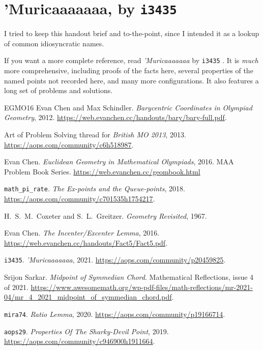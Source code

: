 \documentclass[11pt]{scrartcl}
\begin{document}
\section{’Muricaaaaaaa, by \texttt{i3435}}
I tried to keep this handout brief and to-the-point,
since I intended it as a lookup of common idiosyncratic names.

If you want a more complete reference,
read \emph{’Muricaaaaaaa} by \texttt{i3435} \cite{M21}.
It is \emph{much} more comprehensive, including proofs of the facts here,
several properties of the named points not recorded here, and many more configurations.
It also features a long set of problems and solutions.

\begin{thebibliography}{EGMO16}
  Evan Chen and Max Schindler.
  \emph{Barycentric Coordinates in Olympiad Geometry}, 2012.
  \url{https://web.evanchen.cc/handouts/bary/bary-full.pdf}.

  Art of Problem Solving thread for \textit{British MO 2013}, 2013.
  \url{https://aops.com/community/c6h518987}.

  Evan Chen.
  \emph{Euclidean Geometry in Mathematical Olympiads}, 2016.
  MAA Problem Book Series.
  \url{https://web.evanchen.cc/geombook.html}

  \texttt{math\_pi\_rate}.
  \textit{The Ex-points and the Queue-points}, 2018.
  \url{https://aops.com/community/c701535h1754217}.

  H.\ S.\ M.\ Coxeter and S.\ L.\ Greitzer.
  \emph{Geometry Revisited}, 1967.

  Evan Chen. \textit{The Incenter/Excenter Lemma}, 2016.
  \url{https://web.evanchen.cc/handouts/Fact5/Fact5.pdf}.

  \texttt{i3435}. \textit{’Muricaaaaaaa}, 2021.
  \url{https://aops.com/community/p20459825}.

  Srijon Sarkar. \textit{Midpoint of Symmedian Chord}.
  Mathematical Reflections, issue 4 of 2021.
  \url{https://www.awesomemath.org/wp-pdf-files/math-reflections/mr-2021-04/mr_4_2021_midpoint_of_symmedian_chord.pdf}.

  \texttt{mira74}. \textit{Ratio Lemma}, 2020.
  \url{https://aops.com/community/p19166714}.

  \texttt{aops29}. \textit{Properties Of The Sharky-Devil Point}, 2019.
  \url{https://aops.com/community/c946900h1911664}.


\end{thebibliography}
\end{document}
